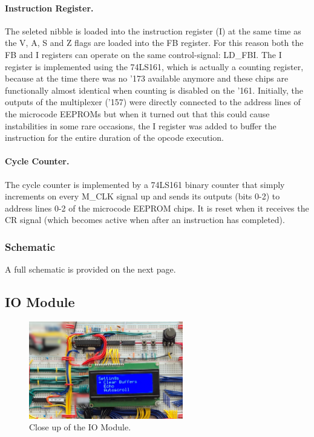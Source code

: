\paragraph{Instruction Register.} The seleted nibble is loaded into the instruction register (I) at the same time as the V, A, S and Z flags are loaded into the FB register. For this reason both the FB and I registers can operate on the same control-signal: LD\_FBI. The I register is implemented using the 74LS161, which is actually a counting register, because at the time there was no '173 available anymore and these chips are functionally almost identical when counting is disabled on the '161. Initially, the outputs of the multiplexer ('157) were directly connected to the address lines of the microcode EEPROMs but when it turned out that this could cause instabilities in some rare occasions, the I register was added to buffer the instruction for the entire duration of the opcode execution.
 
\paragraph{Cycle Counter.} The cycle counter is implemented by a 74LS161 binary counter that simply increments on every M\_CLK signal up and sends its outputs (bits 0-2) to address lines 0-2 of the microcode EEPROM chips. It is reset when it receives the CR signal (which becomes active when after an instruction has completed).


\subsubsection{Schematic}
A full schematic is provided on the next page.


\subsection{IO Module} \label{sec:implementation:io}
\begin{figure}[H]
  \centering
  \includegraphics[width=0.6\textwidth]{img/iomodulecloseup}
  \caption{Close up of the IO Module.}
  \label{fig:iomodulecloseup}
\end{figure}

